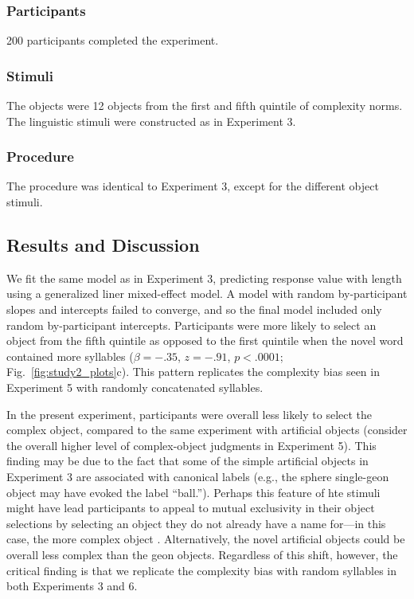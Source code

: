 \documentclass[man]{apa2}
\begin{document}
\subsubsection{Participants} 200 participants completed the experiment.
\subsubsection{Stimuli} The objects were 12 objects from the first and fifth quintile of complexity norms. The linguistic stimuli were constructed as in Experiment 3.

\subsubsection{Procedure}
The procedure was identical to Experiment 3, except for the different object stimuli.

\subsection{Results and Discussion}
We fit the same model as in Experiment 3, predicting response value with length using a generalized liner mixed-effect model. A model with random by-participant slopes and intercepts failed to converge, and so the final model included only random by-participant intercepts. Participants were more likely to select an object from the fifth quintile as opposed to the first quintile when the novel word contained more syllables ($\beta = -.35$, $z = -.91$, $p < .0001$; Fig.\ \ref{fig:study2_plots}c). This pattern replicates the complexity bias seen in Experiment 5 with randomly concatenated syllables.

In the present experiment, participants were overall less likely to select the complex object, compared to the same experiment with artificial objects (consider the overall higher level of complex-object judgments in Experiment 5). This finding may be due to the fact that some of the simple artificial objects in Experiment 3 are associated with canonical labels (e.g., the sphere single-geon object may have evoked the label ``ball.''). Perhaps this feature of hte stimuli might have lead participants to appeal to mutual exclusivity in their object selections by selecting an object they do not already have a name for---in this case, the more complex object \cite{markman1988}. Alternatively, the novel artificial objects could be overall less complex than the geon objects. Regardless of this shift, however, the critical finding is that we replicate the complexity bias with random syllables in both Experiments 3 and 6.
\end{document}
